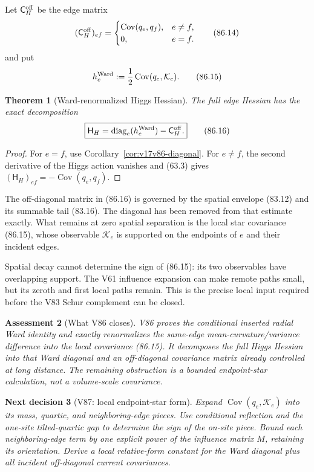 \documentclass[11pt]{article}
\newtheorem{theorem}{Theorem}[section]
\newtheorem{decision}[theorem]{Next decision}
\newtheorem{assessment}[theorem]{Assessment}
\theoremstyle{remark}
\begin{document}
Let \(\mathsf C_H^{\rm off}\) be the edge matrix
\[
 (\mathsf C_H^{\rm off})_{ef}
 =\begin{cases}
   \operatorname{Cov}(q_e,q_f),&e\neq f,\\
   0,&e=f.
  \end{cases}                                     \tag{86.14}
\]
and put
\[
 h_e^{\rm Ward}:=\frac12
 \operatorname{Cov}(q_e,\mathcal K_e).            \tag{86.15}
\]

\begin{theorem}[Ward-renormalized Higgs Hessian]
\label{thm:v17v86-hessian}
The full edge Hessian has the exact decomposition
\[
\boxed{
 \mathsf H_H
 =\operatorname{diag}_e(h_e^{\rm Ward})
 -\mathsf C_H^{\rm off}.}                         \tag{86.16}
\]
\end{theorem}

\begin{proof}
For \(e=f\), use Corollary~\ref{cor:v17v86-diagonal}.  For
\(e\neq f\), the second derivative of the Higgs action vanishes and
(63.3) gives
\((\mathsf H_H)_{ef}=-\operatorname{Cov}(q_e,q_f)\).
\end{proof}

The off-diagonal matrix in (86.16) is governed by the spatial envelope
(83.12) and its summable tail (83.16).  The diagonal has been removed
from that estimate exactly.  What remains at zero spatial separation
is the local star covariance (86.15), whose observable
\(\mathcal K_e\) is supported on the endpoints of \(e\) and their
incident edges.

Spatial decay cannot determine the sign of (86.15): its two
observables have overlapping support.  The V61 influence expansion can
make remote paths small, but its zeroth and first local paths remain.
This is the precise local input required before the V83 Schur
complement can be closed.

\begin{assessment}[What V86 closes]
\label{ass:v17v86-status}
V86 proves the conditional inserted radial Ward identity and exactly
renormalizes the same-edge mean-curvature/variance difference into the
local covariance (86.15).  It decomposes the full Higgs Hessian into
that Ward diagonal and an off-diagonal covariance matrix already
controlled at long distance.  The remaining obstruction is a bounded
endpoint-star calculation, not a volume-scale covariance.
\end{assessment}

\begin{decision}[V87: local endpoint-star form]
\label{dec:v17v86-next}
Expand \(\operatorname{Cov}(q_e,\mathcal K_e)\) into its mass,
quartic, and neighboring-edge pieces.  Use conditional reflection and
the one-site tilted-quartic gap to determine the sign of the on-site
piece.  Bound each neighboring-edge term by one explicit power of the
influence matrix \(M\), retaining its orientation.  Derive a local
relative-form constant for the Ward diagonal plus all incident
off-diagonal current covariances.
\end{decision}
\end{document}
